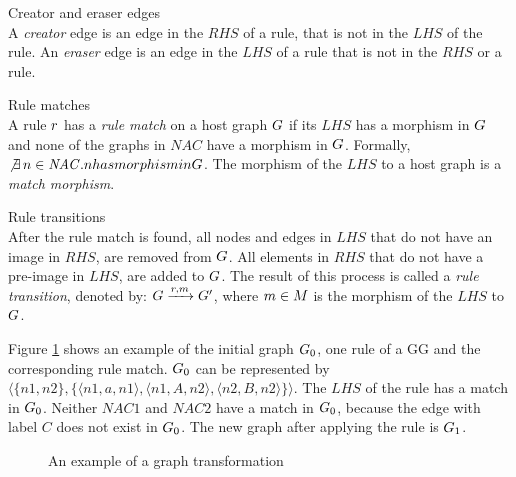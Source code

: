\begin{definition} Creator and eraser edges \\
A \textit{creator} edge is an edge in the $\mathit{RHS}$ of a rule, that is not in the $\mathit{LHS}$ of the rule. An \textit{eraser} edge is an edge in the $\mathit{LHS}$ of a rule that is not in the $\mathit{RHS}$ or a rule.
\end{definition}
\vspace{5px}
\begin{definition} Rule matches \\
A rule $r$ has a \textit{rule match} on a host graph $G$ if its $\mathit{LHS}$ has a morphism in $G$ and none of the graphs in $\mathit{NAC}$ have a morphism in $G$. Formally, $\not\exists\,n \in \mathit{NAC} . n has morphism in G$. The morphism of the $\mathit{LHS}$ to a host graph is a \textit{match morphism}.
\end{definition}

\vspace{5px}
\begin{definition} Rule transitions \\
After the rule match is found, all nodes and edges in $\mathit{LHS}$ that do not have an image in $\mathit{RHS}$, are removed from $G$. All elements in $\mathit{RHS}$ that do not have a pre-image in $\mathit{LHS}$, are added to $G$. The result of this process is called a \textit{rule transition}, denoted by: $G \xrightarrow{r, m}G'$, where $m \in M$ is the morphism of the $\mathit{LHS}$ to $G$.
\end{definition}
\vspace{5px}

Figure \ref{fig:gg_example} shows an example of the initial graph $G_0$, one rule of a GG and the corresponding rule match. $G_0$ can be represented by $\langle\{n1,n2\},\{\langle n1,a,n1\rangle, \langle n1,A,n2\rangle,\langle n2,B,n2\rangle\}\rangle$. The $\mathit{LHS}$ of the rule has a match in $G_0$. Neither $\mathit{NAC1}$ and $\mathit{NAC2}$ have a match in $G_0$, because the edge with label $C$ does not exist in $G_0$. The new graph after applying the rule is $G_1$.

\begin{figure}[ht]
  \begin{center}
    
  \end{center}
  \caption{An example of a graph transformation}
  \label{fig:gg_example}
\end{figure}

